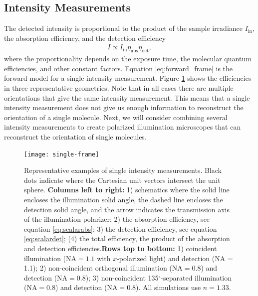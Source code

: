 \documentclass[10pt]{article}
\begin{document}
\subsection{Intensity Measurements}\label{forward}
The detected intensity is proportional to the product of the sample irradiance
$I_{\text{in}}$, the absorption efficiency, and the detection efficiency
\begin{align}
  I \propto I_{\text{in}}\eta_{\text{abs}}\eta_{\text{det}}\label{eq:forward_frame},
\end{align}
where the proportionality depends on the exposure time, the molecular quantum
efficiencies, and other constant factors. Equation \ref{eq:forward_frame} is the
forward model for a single intensity measurement. Figure \ref{fig:single-frame}
shows the efficiencies in three representative geometries. Note that in all
cases there are multiple orientations that give the same intensity
measurement. This means that a single intensity measurement does not give us
enough information to reconstruct the orientation of a single molecule. Next, we
will consider combining several intensity measurements to create polarized
illumination microscopes that can reconstruct the orientation of single
molecules.

\begin{figure}[H]
\centering\texttt{[image: single-frame]}
\caption{Representative examples of single intensity measurements. Black dots
  indicate where the Cartesian unit vectors intersect the unit sphere. \newline \newline \textbf{Columns left to right:} 1) schematics where
  the solid line encloses the illumination solid angle, the dashed line encloses
  the detection solid angle, and the arrow indicates the transmission axis of
  the illumination polarizer; 2) the absorption efficiency, see equation
  \ref{eq:scalarabs}; 3) the detection efficiency, see equation
  \ref{eq:scalardet}; (4) the total efficiency, the product of the absorption
  and detection efficiencies.\newline \newline \textbf{Rows top to bottom:} 1)
  coincident illumination ($\text{NA} = 1.1$ with $x$-polarized light) and
  detection (NA = 1.1); 2) non-coincident orthogonal illumination
  ($\text{NA} = 0.8$) and detection ($\text{NA} = 0.8$); 3) non-coincident
  135${}^{\circ}$-separated illumination ($\text{NA} = 0.8$) and detection
  ($\text{NA} = 0.8$). All simulations use $n=1.33$.}
  \label{fig:single-frame}
\end{figure}
\end{document}
